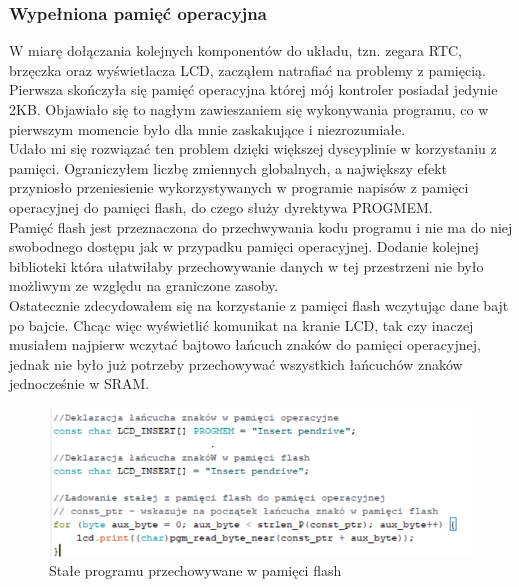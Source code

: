 \documentclass[declaration,shortabstract, mgr]{iithesis}
\begin{document}
\subsubsection{Wypełniona pamięć operacyjna}
\indent W miarę dołączania kolejnych komponentów do układu, tzn. zegara RTC, brzęczka oraz wyświetlacza LCD, zacząłem natrafiać na problemy z pamięcią. \\
\indent Pierwsza skończyła się pamięć operacyjna której mój kontroler posiadał jedynie 2KB. Objawiało się to nagłym zawieszaniem się wykonywania programu, co w pierwszym momencie było dla mnie zaskakujące i niezrozumiałe.\\
\indent Udało mi się rozwiązać ten problem dzięki większej dyscyplinie w korzystaniu z pamięci. Ograniczyłem liczbę zmiennych globalnych, a największy efekt przyniosło przeniesienie wykorzystywanych w programie napisów z pamięci operacyjnej do pamięci flash, do czego służy dyrektywa PROGMEM.\\
\indent Pamięć flash jest przeznaczona do przechwywania kodu programu i nie ma do niej swobodnego dostępu jak w przypadku pamięci operacyjnej. Dodanie kolejnej biblioteki która ułatwiłaby przechowywanie danych w tej przestrzeni nie było możliwym ze względu na graniczone zasoby.\\
\indent Ostatecznie zdecydowałem się na korzystanie z pamięci flash wczytując dane bajt po bajcie. Chcąc więc wyświetlić komunikat na kranie LCD, tak czy inaczej musiałem najpierw wczytać bajtowo łańcuch znaków do pamięci operacyjnej, jednak nie było już potrzeby przechowywać wszystkich łańcuchów znaków jednocześnie w SRAM.
 \begin{figure}[h]
\caption{Stałe programu przechowywane w pamięci flash}
\centering
\includegraphics[scale=0.8]{progmem.png}
\end{figure}
\end{document}
